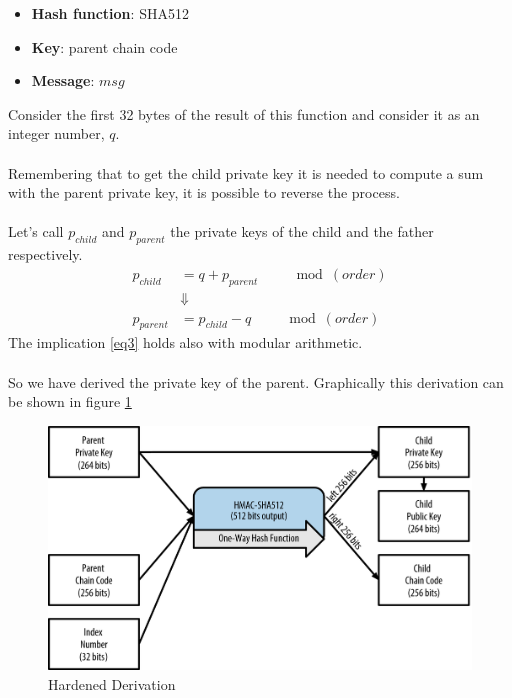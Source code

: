 \begin{itemize}[label=$\odot$]
	\item \textbf{Hash function}: SHA512
	\item \textbf{Key}: parent chain code
	\item \textbf{Message}: $msg$
\end{itemize}
Consider the first 32 bytes of the result of this function and consider it as an integer number, $q$.
\\ \\
Remembering that to get the child private key it is needed to compute a sum with the parent private key, it is possible to reverse the process. \\ \\
Let's call $p_{child}$ and $p_{parent}$ the private keys of the child and the father respectively.
\begin{equation}\label{eq3}
\begin{split}
p_{child} &= q+p_{parent} \qquad \mod (order) \\
&\Downarrow \\
p_{parent} &=p_{child}-q \qquad \mod (order)
\end{split}
\end{equation}
The implication \ref{eq3} holds also with modular arithmetic.
\\ \\
So we have derived the private key of the parent. Graphically this derivation can be shown in figure \ref{fig:from_child_to_parent}
\begin{figure}[ht!]
	\centering
	\includegraphics[width=15cm]{Figures/hardened_derivation.png} %
	\caption{Hardened Derivation }
	\label{fig:from_child_to_parent}
\end{figure}



